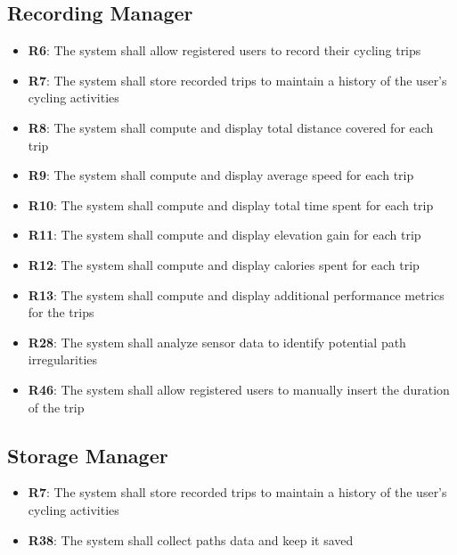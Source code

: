 \subsection*{Recording Manager}
\begin{itemize}
	\item \textbf{R6}: The system shall allow registered users to record their cycling trips
	\item \textbf{R7}: The system shall store recorded trips to maintain a history of the user’s cycling activities
	\item \textbf{R8}: The system shall compute and display total distance covered for each trip
	\item \textbf{R9}: The system shall compute and display average speed for each trip
	\item \textbf{R10}: The system shall compute and display total time spent for each trip
	\item \textbf{R11}: The system shall compute and display elevation gain for each trip
	\item \textbf{R12}: The system shall compute and display calories spent for each trip
	\item \textbf{R13}: The system shall compute and display additional performance metrics for the trips
	\item \textbf{R28}: The system shall analyze sensor data to identify potential path irregularities
	\item \textbf{R46}: The system shall allow registered users to manually insert the duration of the trip
\end{itemize}

\subsection*{Storage Manager}
\begin{itemize}
	\item \textbf{R7}: The system shall store recorded trips to maintain a history of the user’s cycling activities
	\item \textbf{R38}: The system shall collect paths data and keep it saved
\end{itemize}

